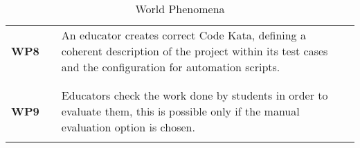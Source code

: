 \begin{table}[H]
\begin{tabular}{l l p{12cm}}
        \textbf{WP8} & \vline & An educator creates correct Code Kata, defining a coherent description of the project within its test cases and the configuration for automation scripts.       \\
                     &        &                                                                                                                                                                 \\\hline & & \\
        \textbf{WP9} & \vline & Educators check the work done by students in order to evaluate them, this is possible only if the manual evaluation option is chosen.                           \\
                     &        &                                                                                                                                                                 \\
        \hline
    \end{tabular}
    \caption{World Phenomena}
\end{table}

\newpage

